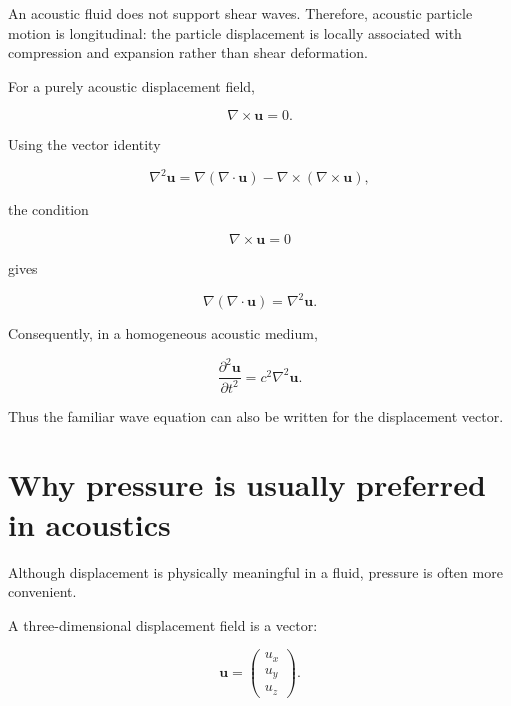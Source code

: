 \documentclass[11pt]{article}
\begin{document}
An acoustic fluid does not support shear waves. Therefore, acoustic particle motion is longitudinal: the particle displacement is locally associated with compression and expansion rather than shear deformation.

For a purely acoustic displacement field,

\begin{equation}
    \nabla\times\bm{u}=0.
\end{equation}

Using the vector identity

\begin{equation}
    \nabla^2\bm{u}
    =
    \nabla(\nabla\cdot\bm{u})
    -
    \nabla\times(\nabla\times\bm{u}),
\end{equation}

the condition

\begin{equation}
    \nabla\times\bm{u}=0
\end{equation}

gives

\begin{equation}
    \nabla(\nabla\cdot\bm{u})
    =
    \nabla^2\bm{u}.
\end{equation}

Consequently, in a homogeneous acoustic medium,

\begin{equation}
    \boxed{
    \frac{\partial^2\bm{u}}{\partial t^2}
    =
    c^2\nabla^2\bm{u}.
    }
\end{equation}

Thus the familiar wave equation can also be written for the displacement vector.

\section{Why pressure is usually preferred in acoustics}

Although displacement is physically meaningful in a fluid, pressure is often more convenient.

A three-dimensional displacement field is a vector:

\begin{equation}
    \bm{u}=
    \begin{pmatrix}
    u_x\\
    u_y\\
    u_z
    \end{pmatrix}.
\end{equation}
\end{document}
